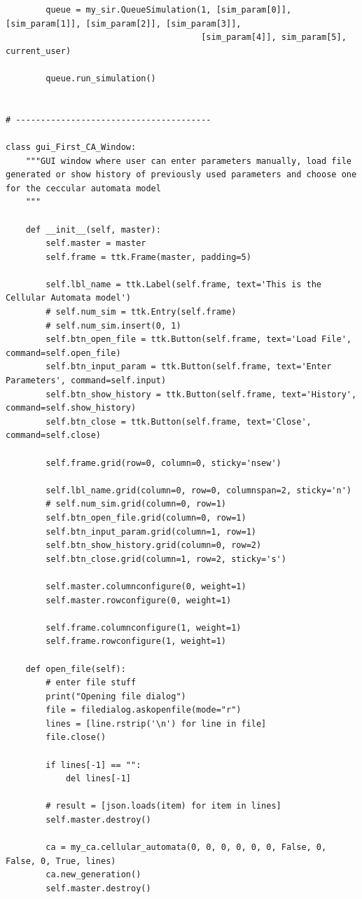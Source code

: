 \documentclass[11pt, a4paper]{article}
\begin{document}
\begin{lstlisting}
        queue = my_sir.QueueSimulation(1, [sim_param[0]], [sim_param[1]], [sim_param[2]], [sim_param[3]],
                                       [sim_param[4]], sim_param[5], current_user)

        queue.run_simulation()


# ---------------------------------------

class gui_First_CA_Window:
    """GUI window where user can enter parameters manually, load file generated or show history of previously used parameters and choose one for the ceccular automata model
    """

    def __init__(self, master):
        self.master = master
        self.frame = ttk.Frame(master, padding=5)

        self.lbl_name = ttk.Label(self.frame, text='This is the Cellular Automata model')
        # self.num_sim = ttk.Entry(self.frame)
        # self.num_sim.insert(0, 1)
        self.btn_open_file = ttk.Button(self.frame, text='Load File', command=self.open_file)
        self.btn_input_param = ttk.Button(self.frame, text='Enter Parameters', command=self.input)
        self.btn_show_history = ttk.Button(self.frame, text='History', command=self.show_history)
        self.btn_close = ttk.Button(self.frame, text='Close', command=self.close)

        self.frame.grid(row=0, column=0, sticky='nsew')

        self.lbl_name.grid(column=0, row=0, columnspan=2, sticky='n')
        # self.num_sim.grid(column=0, row=1)
        self.btn_open_file.grid(column=0, row=1)
        self.btn_input_param.grid(column=1, row=1)
        self.btn_show_history.grid(column=0, row=2)
        self.btn_close.grid(column=1, row=2, sticky='s')

        self.master.columnconfigure(0, weight=1)
        self.master.rowconfigure(0, weight=1)

        self.frame.columnconfigure(1, weight=1)
        self.frame.rowconfigure(1, weight=1)

    def open_file(self):
        # enter file stuff
        print("Opening file dialog")
        file = filedialog.askopenfile(mode="r")
        lines = [line.rstrip('\n') for line in file]
        file.close()

        if lines[-1] == "":
            del lines[-1]

        # result = [json.loads(item) for item in lines]
        self.master.destroy()

        ca = my_ca.cellular_automata(0, 0, 0, 0, 0, 0, False, 0, False, 0, True, lines)
        ca.new_generation()
        self.master.destroy()


\end{lstlisting}
\end{document}
